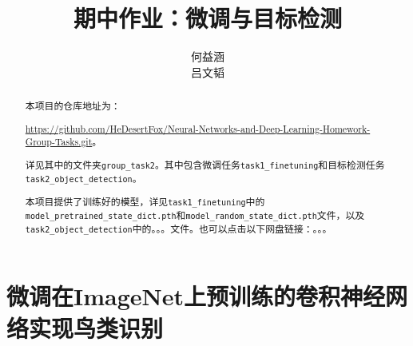 \documentclass[notitlepage,cs4size,punct,oneside]{ctexrep}
\title{{\zihao{1}\bfseries 期中作业：微调与目标检测}}
\author{何益涵 \quad 20307110032\\吕文韬 \quad }
\date{}
\numberwithin{equation}{chapter}
\theoremstyle{mystyle}
\begin{document}
\CTEXoptions[abstractname={摘要: }]
\CTEXoptions[bibname={\bfseries 参考文献}]

\renewcommand{\thepage}{\roman{page}}
\setcounter{page}{1}

\maketitle\renewcommand{\thepage}{\arabic{page}}
\thispagestyle{empty}\setcounter{page}{0}
\renewcommand{\abstractname}{摘要: }
\begin{abstract}
     本项目的仓库地址为：

     \url{https://github.com/HeDesertFox/Neural-Networks-and-Deep-Learning-Homework-Group-Tasks.git}。

     详见其中的文件夹\texttt{group\_task2}。其中包含微调任务\texttt{task1\_finetuning}和目标检测任务\texttt{task2\_object\_detection}。

     本项目提供了训练好的模型，详见\texttt{task1\_finetuning}中的\texttt{model\_pretrained\_state\_dict.pth}和\texttt{model\_random\_state\_dict.pth}文件，以及\texttt{task2\_object\_detection}中的。。。文件。也可以点击以下网盘链接：。。。\\



\end{abstract}



\chapter{微调在ImageNet上预训练的卷积神经网络实现鸟类识别}
\end{document}

